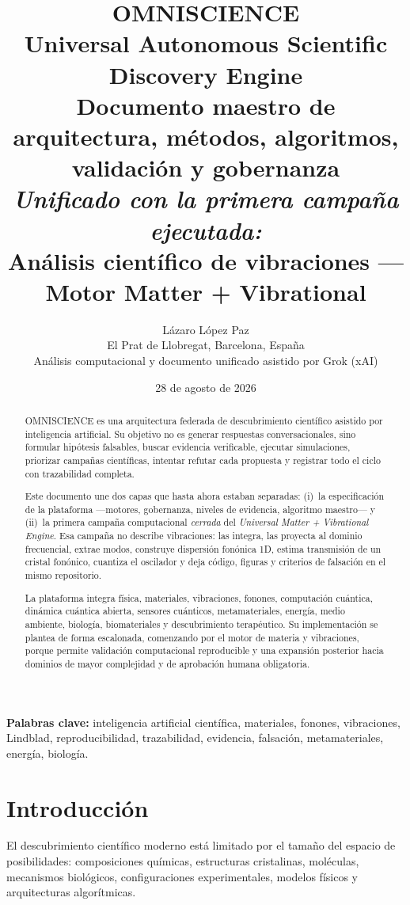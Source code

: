 \documentclass[11pt,a4paper]{article}
\title{\textbf{OMNISCIENCE}\\
\large Universal Autonomous Scientific Discovery Engine\\[0.25cm]
\normalsize Documento maestro de arquitectura, métodos, algoritmos, validación y gobernanza\\[0.15cm]
\large\textit{Unificado con la primera campaña ejecutada:}\\
\normalsize Análisis científico de vibraciones --- Motor Matter + Vibrational}
\author{Lázaro López Paz\\El Prat de Llobregat, Barcelona, España\\[0.15cm]
\small Análisis computacional y documento unificado asistido por Grok (xAI)}
\date{28 de agosto de 2026}
\begin{document}
\maketitle

\begin{abstract}
OMNISCIENCE es una arquitectura federada de descubrimiento científico asistido por inteligencia artificial. Su objetivo no es generar respuestas conversacionales, sino formular hipótesis falsables, buscar evidencia verificable, ejecutar simulaciones, priorizar campañas científicas, intentar refutar cada propuesta y registrar todo el ciclo con trazabilidad completa.

Este documento une dos capas que hasta ahora estaban separadas: (i)~la especificación de la plataforma ---motores, gobernanza, niveles de evidencia, algoritmo maestro--- y (ii)~la primera campaña computacional \emph{cerrada} del \textit{Universal Matter + Vibrational Engine}. Esa campaña no describe vibraciones: las integra, las proyecta al dominio frecuencial, extrae modos, construye dispersión fonónica 1D, estima transmisión de un cristal fonónico, cuantiza el oscilador y deja código, figuras y criterios de falsación en el mismo repositorio.

La plataforma integra física, materiales, vibraciones, fonones, computación cuántica, dinámica cuántica abierta, sensores cuánticos, metamateriales, energía, medio ambiente, biología, biomateriales y descubrimiento terapéutico. Su implementación se plantea de forma escalonada, comenzando por el motor de materia y vibraciones, porque permite validación computacional reproducible y una expansión posterior hacia dominios de mayor complejidad y de aprobación humana obligatoria.
\end{abstract}

\noindent\textbf{Palabras clave:} inteligencia artificial científica, materiales, fonones, vibraciones, Lindblad, reproducibilidad, trazabilidad, evidencia, falsación, metamateriales, energía, biología.

\tableofcontents
\newpage

\section{Introducción}

El descubrimiento científico moderno está limitado por el tamaño del espacio de posibilidades: composiciones químicas, estructuras cristalinas, moléculas, mecanismos biológicos, configuraciones experimentales, modelos físicos y arquitecturas algorítmicas.
\end{document}
